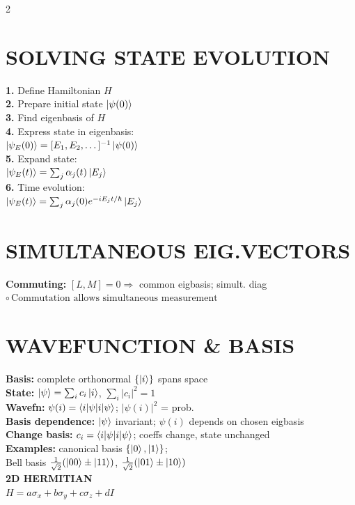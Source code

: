 \documentclass[10pt,a4paper]{article}
\begin{document}
\begin{multicols}{2}
\section{SOLVING STATE EVOLUTION}
\textbf{1.} Define Hamiltonian $H$ \\
\textbf{2.} Prepare initial state $\ket{\psi(0)}$ \\
\textbf{3.} Find eigenbasis of $H$ \\
\textbf{4.} Express state in eigenbasis:\\
$\ket{\psi_E(0)} = [E_1, E_2, \dots]^{-1} \ket{\psi(0)}$\\
\textbf{5.} Expand state:\\
$\ket{\psi_E(t)} = \sum_j \alpha_j(t) \ket{E_j}$\\
\textbf{6.} Time evolution:\\
$\ket{\psi_E(t)} = \sum_j \alpha_j(0) e^{-i E_j t / \hbar} \ket{E_j}$\\

\section{SIMULTANEOUS EIG.VECTORS}

\textbf{Commuting:} $[L,M]=0 \Rightarrow$ common eigbasis; simult. diag \\
$\circ\, \text{Commutation allows simultaneous measurement}$\\

\section{WAVEFUNCTION \& BASIS}
\textbf{Basis:} complete orthonormal $\{\ket{i}\}$ spans space \\
\textbf{State:} $\ket{\psi}=\sum_i c_i\ket{i}$, $\sum_i |c_i|^2=1$ \\
\textbf{Wavefn:} $\psi(i)=\braket{i|\psi}$; $|\psi(i)|^2$ = prob. \\
\textbf{Basis dependence:} $\ket{\psi}$ invariant; $\psi(i)$ depends on chosen eigbasis \\
\textbf{Change basis:} $c_i=\braket{i|\psi}$; coeffs change, state unchanged \\
\textbf{Examples:} canonical basis $\{\ket{0},\ket{1}\}$; \\
Bell basis $\frac{1}{\sqrt{2}}(\ket{00}\pm\ket{11})$, 
$\frac{1}{\sqrt{2}}(\ket{01}\pm\ket{10})$ \\

\textbf{2D HERMITIAN } \\
$H=a\sigma_x+b\sigma_y+c\sigma_z+dI$\\


\end{multicols}
\end{document}
